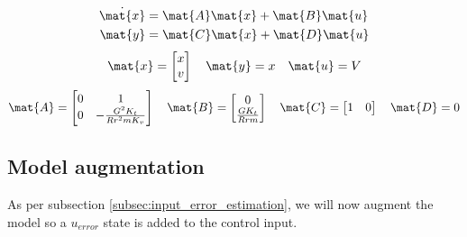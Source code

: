 \begin{theorem}
  \begin{align*}
    \dot{\mat{x}} &= \mat{A} \mat{x} + \mat{B} \mat{u} \\
    \mat{y} &= \mat{C} \mat{x} + \mat{D} \mat{u}
  \end{align*}
  \begin{equation*}
    \mat{x} =
    \begin{bmatrix}
      x \\
      v
    \end{bmatrix}
    \quad
    \mat{y} = x
    \quad
    \mat{u} = V
  \end{equation*}
  \begin{equation}
    \mat{A} =
    \begin{bmatrix}
      0 & 1 \\
      0 & -\frac{G^2 K_t}{Rr^2 mK_v}
    \end{bmatrix}
    \quad
    \mat{B} =
    \begin{bmatrix}
      0 \\
      \frac{GK_t}{Rrm}
    \end{bmatrix}
    \quad
    \mat{C} =
    \begin{bmatrix}
      1 & 0
    \end{bmatrix}
    \quad
    \mat{D} = 0
  \end{equation}
\end{theorem}

\subsection{Model augmentation}

As per subsection \ref{subsec:input_error_estimation}, we will now augment the
\gls{model} so a $u_{error}$ state is added to the \gls{control input}.

